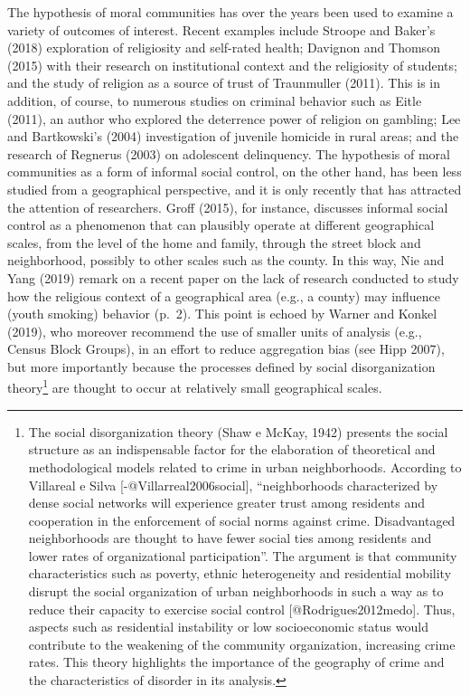\documentclass[smallextended]{svjour3}       %
\begin{document}
The hypothesis of moral communities has over the years been used to
examine a variety of outcomes of interest. Recent examples include
Stroope and Baker's (2018) exploration of religiosity and self-rated
health; Davignon and Thomson (2015) with their research on institutional
context and the religiosity of students; and the study of religion as a
source of trust of Traunmuller (2011). This is in addition, of course,
to numerous studies on criminal behavior such as Eitle (2011), an author
who explored the deterrence power of religion on gambling; Lee and
Bartkowski's (2004) investigation of juvenile homicide in rural areas;
and the research of Regnerus (2003) on adolescent delinquency. The
hypothesis of moral communities as a form of informal social control, on
the other hand, has been less studied from a geographical perspective,
and it is only recently that has attracted the attention of researchers.
Groff (2015), for instance, discusses informal social control as a
phenomenon that can plausibly operate at different geographical scales,
from the level of the home and family, through the street block and
neighborhood, possibly to other scales such as the county. In this way,
Nie and Yang (2019) remark on a recent paper on the lack of research
conducted to study how the religious context of a geographical area
(e.g., a county) may influence (youth smoking) behavior (p.~2). This
point is echoed by Warner and Konkel (2019), who moreover recommend the
use of smaller units of analysis (e.g., Census Block Groups), in an
effort to reduce aggregation bias (see Hipp 2007), but more importantly
because the processes defined by social disorganization
theory\footnote{The social disorganization theory (Shaw e McKay, 1942)  presents the social structure as an indispensable factor for the elaboration of theoretical and methodological models related to crime in urban neighborhoods. According to Villareal e Silva [-@Villarreal2006social], “neighborhoods characterized by dense social networks will experience greater trust among residents and cooperation in the enforcement of social norms against crime. Disadvantaged neighborhoods are thought to have fewer social ties among residents and lower rates of organizational participation”. The argument is that community characteristics such as poverty, ethnic heterogeneity and residential mobility disrupt the social organization of urban neighborhoods in such a way as to reduce their capacity to exercise social control [@Rodrigues2012medo]. Thus, aspects such as residential instability or low socioeconomic status would contribute to the weakening of the community organization, increasing crime rates. This theory highlights the importance of the geography of crime and the characteristics of disorder in its analysis.}
are thought to occur at relatively small geographical scales.
\end{document}
